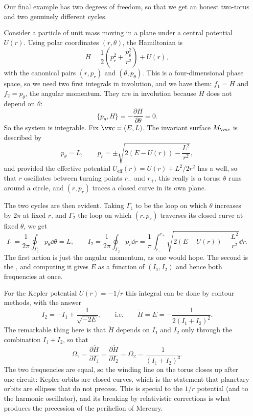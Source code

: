 Our final example has two degrees of freedom, so that we get an honest two-torus and two genuinely different cycles.

\begin{example}
	Consider a particle of unit mass moving in a plane under a central potential $U(r)$. Using polar coordinates $(r, \theta)$, the Hamiltonian is
	$$
	H = \frac{1}{2}\left(p_r^2 + \frac{p_\theta^2}{r^2}\right) + U(r),
	$$
	with the canonical pairs $(r, p_r)$ and $(\theta, p_\theta)$. This is a four-dimensional phase space, so we need two first integrals in involution, and we have them: $f_1 = H$ and $f_2 = p_\theta$, the angular momentum. They are in involution because $H$ does not depend on $\theta$:
	$$
	\{p_\theta, H\} = -\frac{\partial H}{\partial \theta} = 0.
	$$
	So the system is integrable. Fix $\vv c = (E, L)$. The invariant surface $M_{\vv c}$ is described by
	$$
	p_\theta = L, \qquad p_r = \pm\sqrt{2(E - U(r)) - \frac{L^2}{r^2}},
	$$
	and provided the effective potential $U_{\text{eff}}(r) = U(r) + L^2/2r^2$ has a well, so that $r$ oscillates between turning points $r_-$ and $r_+$, this really is a torus: $\theta$ runs around a circle, and $(r, p_r)$ traces a closed curve in its own plane.

	The two cycles are then evident. Taking $\Gamma_1$ to be the loop on which $\theta$ increases by $2\pi$ at fixed $r$, and $\Gamma_2$ the loop on which $(r, p_r)$ traverses its closed curve at fixed $\theta$, we get
	$$
	I_1 = \frac{1}{2\pi}\oint_{\Gamma_1}p_\theta\dd\theta = L, \qquad
	I_2 = \frac{1}{2\pi}\oint_{\Gamma_2}p_r\dd r = \frac{1}{\pi}\int_{r_-}^{r_+}\sqrt{2(E-U(r)) - \frac{L^2}{r^2}}\dd r.
	$$
	The first action is just the angular momentum, as one would hope. The second is the , and computing it gives $E$ as a function of $(I_1, I_2)$ and hence both frequencies at once.

	For the Kepler potential $U(r) = -1/r$ this integral can be done by contour methods, with the answer
	$$
	I_2 = -I_1 + \frac{1}{\sqrt{-2E}}, \qquad \text{i.e.} \qquad \tilde H = E = -\frac{1}{2(I_1+I_2)^2}.
	$$
	The remarkable thing here is that $\tilde H$ depends on $I_1$ and $I_2$ only through the combination $I_1 + I_2$, so that
	$$
	\Omega_1 = \frac{\partial\tilde H}{\partial I_1} = \frac{\partial\tilde H}{\partial I_2} = \Omega_2 = \frac{1}{(I_1+I_2)^3}.
	$$
	The two frequencies are equal, so the winding line on the torus closes up after one circuit: Kepler orbits are closed curves, which is the statement that planetary orbits are ellipses that do not precess. This  is special to the $1/r$ potential (and to the harmonic oscillator), and its breaking by relativistic corrections is what produces the precession of the perihelion of Mercury.
\end{example}


